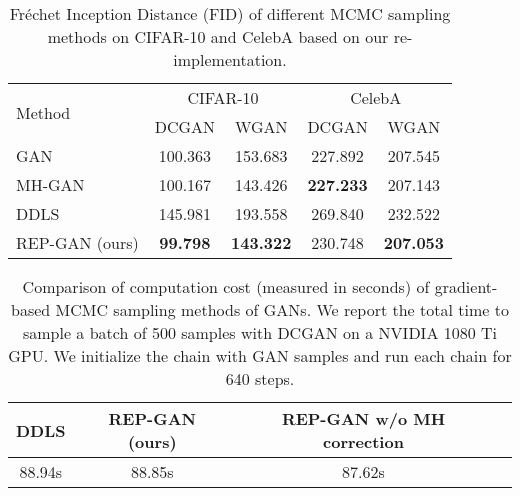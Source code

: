 \documentclass{article} %
\newcommand{\<}{\left\langle}
\renewcommand{\>}{\right\rangle}
\begin{document}
\begin{table}[t]\centering
    \caption{Fréchet Inception Distance (FID) of different MCMC sampling methods on CIFAR-10 and CelebA based on our re-implementation.}
    \label{tab:cifar-10-fid-results}
    \begin{tabular}{lcccc}
    \toprule
    \multirow{2}{*}{Method} &  \multicolumn{2}{c}{CIFAR-10} &  \multicolumn{2}{c}{CelebA} \\
    & DCGAN & WGAN & DCGAN & WGAN \\
    \midrule
GAN    & 100.363 & 153.683 & 227.892 & 207.545 \\
MH-GAN \citep{turner2019metropolis} & 100.167 & 143.426 & {\bf 227.233} & 207.143 \\
DDLS \citep{che2020your}   & 145.981 & 193.558 & 269.840 & 232.522 \\
REP-GAN (ours)   & {\bf 99.798}  & {\bf 143.322} & 230.748 & {\bf 207.053} \\    
    \bottomrule
    \end{tabular}
\end{table}



\begin{table}[t]
    \caption{Comparison of computation cost (measured in seconds) of gradient-based MCMC sampling methods of GANs. We report the total time to sample a batch of 500 samples with DCGAN on a NVIDIA 1080 Ti GPU. We initialize the chain with GAN samples and run each chain for 640 steps.}
    \label{tab:compare-computation-time}
    \begin{center}
    \begin{tabular}{cccc}
    \toprule
    {\bf DDLS} & {\bf REP-GAN (ours)} & {\bf REP-GAN w/o MH correction} \\
    \midrule
    88.94s & 88.85s & 87.62s \\
    \bottomrule
    \end{tabular}
    \end{center}
\end{table}
\end{document}
